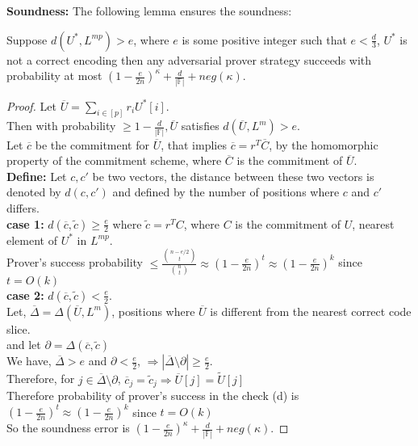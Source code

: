 \textbf{Soundness:} The following lemma ensures the soundness:
 \begin{lemma} Suppose $d(U^*,L^{mp})>e$, where $e$ is some positive integer such that $e<\frac{d}{3}$, $U^*$ is not a correct encoding then any adversarial prover strategy succeeds with probability at most $(1-\frac{e}{2n})^{\kappa}+\frac{d}{|\mathbb{F}|}+neg(\kappa)$.
 \end{lemma}
 
 \begin{proof}
 	Let $\overline{U}= \sum\limits_{i\in[p]}r_iU^{*}[i]$.\\
	Then with probability $\geq 1-\frac{d}{|\mathbb{F}|}, \overline{U}$ satisfies $d(\overline{U},L^m)>e$.\\
	Let $\overline{c}$ be the commitment for $\overline{U}$, that implies $\overline{c}=r^T\overline{C}$, by the homomorphic property of the commitment scheme, where $\overline{C}$ is the commitment of $\overline{U}$.\\
	\textbf{Define: } Let $c,c'$ be two vectors, the distance between these two vectors is denoted by $d(c,c')$ and defined by the number of positions where $c$ and $c'$ differs.\\
	\textbf{case 1:} $d(\overline{c},\tilde{c})\geq \frac{e}{2}$ where $\tilde{c}= r^TC$, where $C$ is the commitment of $U$, nearest element of $U^*$ in $L^{mp}$.\\
	Prover's success probability $\leq \frac{\binom{n-e/2}{t}}{\binom{n}{t}}\approx(1-\frac{e}{2n})^t\approx(1-\frac{e}{2n})^k$ since $t=O(k)$\\
	\textbf{case 2:} $d(\overline{c},\tilde{c})< \frac{e}{2}$.\\
	Let, $\overline{\Delta}=\Delta(\overline{U}, L^m)$, positions where $\overline{U}$ is different from the nearest correct code slice.\\
	and let $\partial=\Delta(\overline{c},\tilde{c})$\\
	We have, $\overline{\Delta}>e$ and $\partial<\frac{e}{2}$, 
	$\Rightarrow |\overline{\Delta}\setminus \partial| \geq \frac{e}{2}$.\\
	Therefore, for $j\in \overline{\Delta}\setminus \partial$, $\overline{c}_j=\tilde{c}_j \Rightarrow \overline{U}[j]=\widetilde{U}[j]$\\
	Therefore probability of prover's success in the check (d) is $(1-\frac{e}{2n})^t\approx(1-\frac{e}{2n})^k$ since $t=O(k)$\\
	So the soundness error is $(1-\frac{e}{2n})^{\kappa}+\frac{d}{|\mathbb{F}|}+neg(\kappa)$.
 \end{proof}
 

